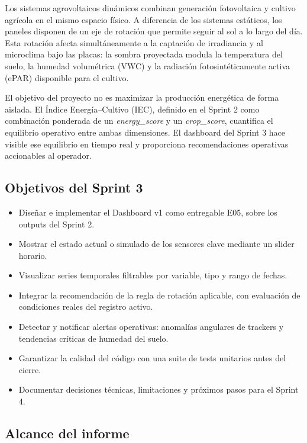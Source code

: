 \documentclass[11pt,a4paper]{article}
\begin{document}
Los sistemas agrovoltaicos dinámicos combinan generación fotovoltaica y cultivo agrícola
en el mismo espacio físico. A diferencia de los sistemas estáticos, los paneles disponen de
un eje de rotación que permite seguir al sol a lo largo del día. Esta rotación afecta
simultáneamente a la captación de irradiancia y al microclima bajo las placas: la sombra
proyectada modula la temperatura del suelo, la humedad volumétrica (VWC) y la radiación
fotosintéticamente activa (ePAR) disponible para el cultivo.

El objetivo del proyecto no es maximizar la producción energética de forma aislada. El
Índice Energía–Cultivo (IEC), definido en el Sprint 2 como combinación ponderada de un
\textit{energy\_score} y un \textit{crop\_score}, cuantifica el equilibrio operativo entre ambas
dimensiones. El dashboard del Sprint 3 hace visible ese equilibrio en tiempo real y
proporciona recomendaciones operativas accionables al operador.

\subsection{Objetivos del Sprint 3}

\begin{itemize}
  \item Diseñar e implementar el Dashboard v1 como entregable E05, sobre los outputs del Sprint 2.
  \item Mostrar el estado actual o simulado de los sensores clave mediante un slider horario.
  \item Visualizar series temporales filtrables por variable, tipo y rango de fechas.
  \item Integrar la recomendación de la regla de rotación aplicable, con evaluación de
    condiciones reales del registro activo.
  \item Detectar y notificar alertas operativas: anomalías angulares de trackers y tendencias
    críticas de humedad del suelo.
  \item Garantizar la calidad del código con una suite de tests unitarios antes del cierre.
  \item Documentar decisiones técnicas, limitaciones y próximos pasos para el Sprint 4.
\end{itemize}

\subsection{Alcance del informe}
\end{document}
